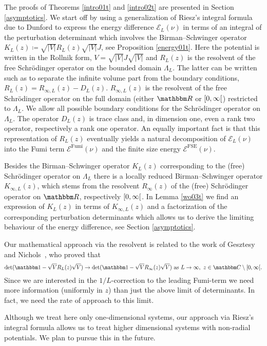 The proofs of Theorems \ref{intro01t} and \ref{intro02t} are presented in Section \ref{asymptotics}.
We start off by using a generalization of Riesz's integral formula due to Dunford 
to express the energy difference $\mathcal{E}_L(\nu)$ in terms of an integral of the perturbation determinant 
which involves the Birman--Schwinger operator $K_L(z)\coloneqq \sqrt{|V|}R_L(z)\sqrt{|V|}J$, see Proposition \ref{energy01t}.
Here the potential is written in the Rollnik form, $V=\sqrt{|V|}J\sqrt{|V|}$ and 
$R_L(z)$ is the resolvent of the free Schr\"odinger operator on the bounded domain $\Lambda_L$.
The latter can be written such as to separate the infinite volume part from the boundary conditions, 
$R_L(z) = R_{\infty,L}(z) -D_L(z)$.
$R_{\infty,L}(z)$ is the resolvent of the free Schr\"odinger operator on the full domain 
(either $\R$ or $\interval[open right]{0}{\infty}$) restricted to $\Lambda_L$. 
We allow all possible boundary conditions for the Schr\"odinger operator on $\Lambda_L$. 
The operator $D_L(z)$ is trace class and, in dimension one, even a rank two operator, respectively a rank one operator.
An equally important fact is that this representation of $R_L(z)$ eventually yields a natural decomposition of $\mathcal E_L(\nu)$ 
into the Fumi term $\mathcal{E}^{\text{Fumi}}(\nu)$ and the finite size energy $\mathcal{E}^{\text{FSE}}(\nu)$.

Besides the Birman--Schwinger operator $K_L(z)$ corresponding to the (free) Schr\"odinger operator on $\Lambda_L$ 
there is a locally reduced Birman--Schwinger operator $K_{\infty,L}(z)$, 
which stems from the resolvent $R_\infty(z)$ of the (free) Schr\"odinger operator on $\R$, 
respectively $\interval[open right]{0}{\infty}$. 
In Lemma \ref{wo03t} we find an expression of $K_L(z)$ in terms of $K_{\infty,L}(z)$ 
and a factorization of the corresponding perturbation determinants
which allows us to derive the limiting behaviour of the energy difference, see Section \eqref{asymptotics}.

Our mathematical approach via the resolvent is related to the work of Gesztesy and Nichols~\cite[Lemma 3.2]{GesztesyNichols2012},
who proved that
\begin{equation*}
  \det(\id-\sqrt{V}R_L(z)\sqrt{V}) \to \det(\id-\sqrt{V}R_\infty(z)\sqrt{V}) \ \text{as}\ L\to\infty,\
    z\in\C\setminus\interval[open right]{0}{\infty} .
\end{equation*}
Since we are interested in the $1/L$-correction to the leading Fumi-term 
we need more information (uniformly in $z$) than just the above limit of determinants. 
In fact, we need the rate of approach to this limit. 

Although we treat here only one-dimensional systems, our approach via
Riesz's integral formula allows us to treat higher dimensional systems
with non-radial potentials. We plan to pursue this in the future.
